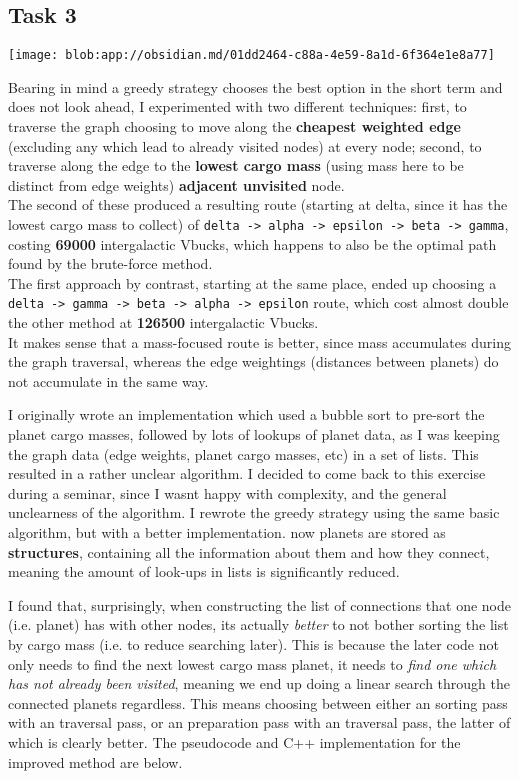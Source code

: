 \documentclass[
]{article}
\begin{document}
\subsection{Task 3}\label{task-3}

\texttt{[image: blob:app://obsidian.md/01dd2464-c88a-4e59-8a1d-6f364e1e8a77]}

\hfill\break
Bearing in mind a greedy strategy chooses the best option in the short
term and does not look ahead, I experimented with two different
techniques: first, to traverse the graph choosing to move along the
\textbf{cheapest weighted edge} (excluding any which lead to already
visited nodes) at every node; second, to traverse along the edge to the
\textbf{lowest cargo mass} (using mass here to be distinct from edge
weights) \textbf{adjacent unvisited} node.\\
The second of these produced a resulting route (starting at delta, since
it has the lowest cargo mass to collect) of
\texttt{delta\ -\textgreater{}\ alpha\ -\textgreater{}\ epsilon\ -\textgreater{}\ beta\ -\textgreater{}\ gamma},
costing \textbf{69000} intergalactic Vbucks, which happens to also be
the optimal path found by the brute-force method.\\
The first approach by contrast, starting at the same place, ended up
choosing a
\texttt{delta\ -\textgreater{}\ gamma\ -\textgreater{}\ beta\ -\textgreater{}\ alpha\ -\textgreater{}\ epsilon}
route, which cost almost double the other method at \textbf{126500}
intergalactic Vbucks.\\
It makes sense that a mass-focused route is better, since mass
accumulates during the graph traversal, whereas the edge weightings
(distances between planets) do not accumulate in the same way.

I originally wrote an implementation which used a bubble sort to
pre-sort the planet cargo masses, followed by lots of lookups of planet
data, as I was keeping the graph data (edge weights, planet cargo
masses, etc) in a set of lists. This resulted in a rather unclear {}
algorithm. I decided to come back to this exercise during a seminar,
since I wasn\textquotesingle t happy with {} complexity, and the general
unclearness of the algorithm. I rewrote the greedy strategy using the
same basic algorithm, but with a better implementation. now planets are
stored as \textbf{structures}, containing all the information about them
and how they connect, meaning the amount of look-ups in lists is
significantly reduced.

I found that, surprisingly, when constructing the list of connections
that one node (i.e. planet) has with other nodes, it\textquotesingle s
actually \emph{better} to not bother sorting the list by cargo mass
(i.e. to reduce searching later). This is because the later code not
only needs to find the next lowest cargo mass planet, it needs to
\emph{find one which has not already been visited}, meaning we end up
doing a linear search through the connected planets regardless. This
means choosing between either an {} sorting pass with an {} traversal
pass, or an {} preparation pass with an {} traversal pass, the latter of
which is clearly better. The pseudocode and C++ implementation for the
improved method are below.
\end{document}
